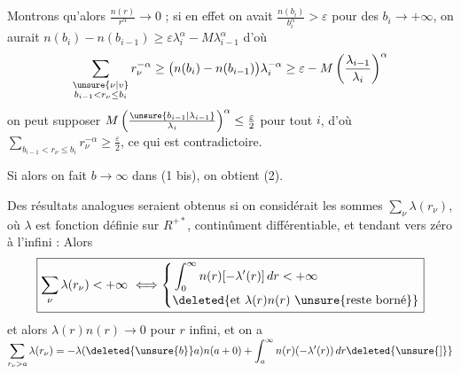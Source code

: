 Montrons qu'alors $\frac{n(r)}{r^\alpha}\to0$ ; si en effet on avait
$\frac{n(b_i)}{b_i^\alpha}>\varepsilon$ pour des $b_i\to+\infty$, on aurait
$n(b_i)-n(b_{i-1})\geq\varepsilon\lambda_i^\alpha-M\lambda_{i-1}^\alpha$ d'où
\[ \sum_{\substack{\unsure{\nu|v}\\b_{i-1}<r_\nu\leq b_i}}r_\nu^{-\alpha}\geq\big(n(b_i)-n(b_{i-1})\big)\lambda_i^{-\alpha}\geq\varepsilon-M\left(\frac{\lambda_{i-1}}{\lambda_i}\right)^\alpha \]
on peut supposer $M\left(\frac{\unsure{b_{i-1}|\lambda_{i-1}}}{\lambda_i}\right)^\alpha\leq\frac{\varepsilon}{2}$ pour tout $i$,
d'où $\sum_{b_{i-1}<r_\nu\leq b_i}r_\nu^{-\alpha}\geq\frac{\varepsilon}{2}$,  ce
qui est contradictoire.

Si alors on fait $b\to\infty$ dans (1 bis), on
obtient (2).

 Des résultats analogues seraient obtenus si
on considérait les sommes $\sum_\nu\lambda(r_\nu)$, où
$\lambda$ est fonction définie sur $R^{+*}$, continûment
différentiable,  et tendant vers zéro
 à l'infini\unsure{\}} : Alors
\[ \boxed{\displaystyle \sum_\nu\lambda(r_\nu)<+\infty\ \Longleftrightarrow\left\{\begin{aligned}&\int_0^\infty n(r)[-\lambda'(r)]\,dr<+\infty\\[-2pt]&\deleted{\text{et }\lambda(r)n(r)\ \text{\unsure{reste borné}}}\end{aligned}\right.} \]
et alors $\lambda(r)n(r)\to0$ pour $r$ infini, et
on a \quad $\displaystyle\sum_{r_\nu>a}\lambda(r_\nu)=-\lambda(\deleted{\unsure{b}}a)n(a+0)+\int_a^\infty n(r)(-\lambda'(r))\,dr\deleted{\unsure{]}}$
